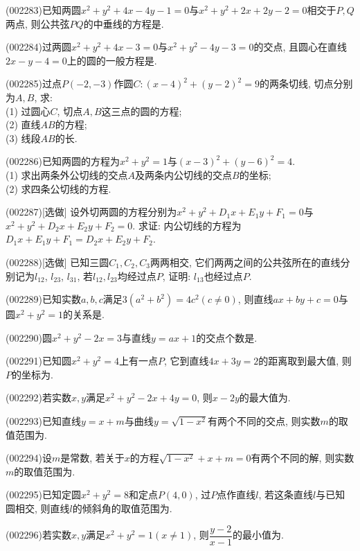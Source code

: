 \item (002283)已知两圆$x^2+y^2+4x-4y-1=0$与$x^2+y^2+2x+2y-2=0$相交于$P,Q$两点, 则公共弦$PQ$的中垂线的方程是.
\item (002284)过两圆$x^2+y^2+4x-3=0$与$x^2+y^2-4y-3=0$的交点, 且圆心在直线$2x-y-4=0$上的圆的一般方程是.
\item (002285)过点$P(-2,-3)$作圆$C:{{(x-4)}^{2}}+{{(y-2)}^{2}}=9$的两条切线, 切点分别为$A,B$, 求:\\ 
(1) 过圆心$C$, 切点$A,B$这三点的圆的方程;\\ 
(2) 直线$AB$的方程;\\ 
(3) 线段$AB$的长.
\item (002286)已知两圆的方程为$x^2+y^2=1$与$(x-3)^2+(y-6)^2=4$.\\ 
(1) 求出两条外公切线的交点$A$及两条内公切线的交点$B$的坐标;\\ 
(2) 求四条公切线的方程.
\item (002287)[选做]
设外切两圆的方程分别为${{x}^{2}}+{{y}^{2}}+{{D}_{1}}x+{{E}_{1}}y+{{F}_{1}}=0$与${{x}^{2}}+{{y}^{2}}+{{D}_{2}}x+{{E}_{2}}y+{{F}_{2}}=0$.
求证: 内公切线的方程为${{D}_{1}}x+{{E}_{1}}y+{{F}_{1}}={{D}_{2}}x+{{E}_{2}}y+{{F}_{2}}$.
\item (002288)[选做]
已知三圆$C_1,C_2,C_3$两两相交, 它们两两之间的公共弦所在的直线分别记为$l_{12}$, $l_{23}$, $l_{31}$, 若$l_{12},l_{23}$均经过点$P$, 证明: $l_{13}$也经过点$P$.
\item (002289)已知实数$a,b,c$满足$3(a^2+b^2)=4c^2(c\ne 0)$, 则直线$ax+by+c=0$与圆$x^2+y^2=1$的关系是.
\item (002290)圆$x^2+y^2-2x=3$与直线$y=ax+1$的交点个数是.
\item (002291)已知圆$x^2+y^2=4$上有一点$P$, 它到直线$4x+3y=2$的距离取到最大值, 则$P$的坐标为.
\item (002292)若实数$x,y$满足$x^2+y^2-2x+4y=0$, 则$x-2y$的最大值为.
\item (002293)已知直线$y=x+m$与曲线$y=\sqrt{1-x^2}$有两个不同的交点, 则实数$m$的取值范围为.
\item (002294)设$m$是常数, 若关于$x$的方程$\sqrt{1-x^2}+x+m=0$有两个不同的解, 则实数$m$的取值范围为.
\item (002295)已知定圆$x^2+y^2=8$和定点$P(4,0)$, 过$P$点作直线$l$, 若这条直线$l$与已知圆相交, 则直线$l$的倾斜角的取值范围为.
\item (002296)若实数$x,y$满足$x^2+y^2=1(x\ne 1)$, 则$\dfrac{y-2}{x-1}$的最小值为.
